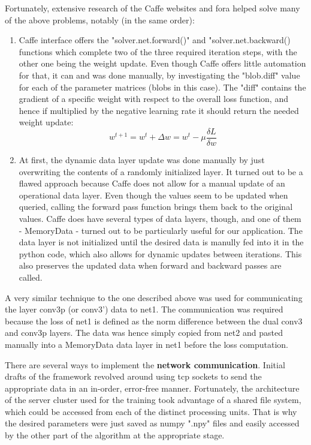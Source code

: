 \documentclass[a4paper, 11pt]{article}
\numberwithin{equation}{section}
\begin{document}
	Fortunately, extensive research of the Caffe websites and fora helped solve many of the above problems, notably (in the same order):
	
	\begin{enumerate}
		\item Caffe interface offers the "solver.net.forward()" and "solver.net.backward() functions which complete two of the three required iteration steps, with the other one being the weight update. Even though Caffe offers little automation for that, it can and was done manually, by investigating the "blob.diff" value for each of the parameter matrices (blobs in this case). The "diff" contains the gradient of a specific weight with respect to the overall loss function, and hence if multiplied by the negative learning rate it should return the needed weight update:
		\begin{equation}
		w^{t+1} = w^t + \Delta w = w^t - \mu \frac{\delta L}{\delta w}
		\end{equation}
		\item At first, the dynamic data layer update was done manually by just overwriting the contents of a randomly initialized layer.  It turned out to be a flawed approach because Caffe does not allow for a manual update of an operational data layer. Even though the values seem to be updated when queried, calling the forward pass function brings them back to the original values. Caffe does have several types of data layers, though, and one of them - MemoryData - turned out to be particularly useful for our application. The data layer is not initialized until the desired data is manully fed into it in the python code, which also allows for dynamic updates between iterations. This also preserves the updated data when forward and backward passes are called.
	\end{enumerate}
	
	A very similar technique to the one described above was used for communicating the layer conv3p (or conv3') data to net1. The communication was required because the loss of net1 is defined as the norm difference between the dual conv3 and conv3p layers. The data was hence simply copied from net2 and pasted manually into a MemoryData data layer in net1 before the loss computation.
	
	There are several ways to implement the \textbf{network communication}. Initial drafts of the framework revolved around using tcp sockets to send the appropriate data in an in-order, error-free manner. Fortunately, the architecture of the server cluster used for the training took advantage of a shared file system, which could be accessed from each of the distinct processing units. That is why the desired parameters were just saved as numpy ".npy" files and easily accessed by the other part of the algorithm at the appropriate stage.
	
\end{document}
